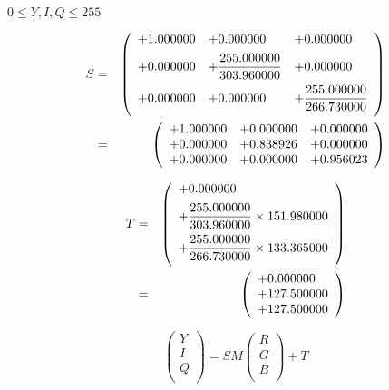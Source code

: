\documentclass{article}
\begin{document}
$ 0 \le Y, I, Q \le 255 $
\pagebreak

\begin{eqnarray*} S &=& \left( \begin{array}{lll} +1.000000 & +0.000000 & +0.000000 \vspace{.5em} \\ +0.000000 & +\dfrac{255.000000}{303.960000} & +0.000000 \vspace{.5em} \\ +0.000000 & +0.000000 & +\dfrac{255.000000}{266.730000} \vspace{.5em} \\ \end{array} \right) \\ &=& \left( \begin{array}{lll} +1.000000 & +0.000000 & +0.000000 \\ +0.000000 & +0.838926 & +0.000000 \\ +0.000000 & +0.000000 & +0.956023 \\ \end{array} \right) \\ \end{eqnarray*}
\pagebreak

\begin{eqnarray*} T &=& \left( \begin{array}{l} +0.000000 \vspace{.5em} \\ +\dfrac{255.000000}{303.960000}\times 151.980000 \vspace{.5em} \\ +\dfrac{255.000000}{266.730000}\times 133.365000 \vspace{.5em} \\ \end{array} \right) \\ &=& \left( \begin{array}{lll} +0.000000 \\ +127.500000 \\ +127.500000 \\ \end{array} \right) \\ \end{eqnarray*}
\pagebreak

\[ \left( \begin{array}{l} Y \\ I \\ Q \\ \end{array} \right) = SM \left( \begin{array}{l} R \\ G \\ B \\ \end{array} \right) + T \]
\pagebreak
\end{document}
